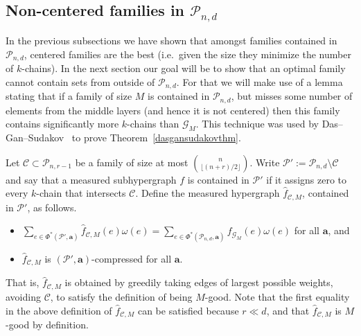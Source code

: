 \documentclass[12pt]{article}
\numberwithin{equation}{section}
\def\C{\mathcal{C}}
\def\G{\mathcal{G}}
\def\P{\mathcal{P}}
\def\w{\omega}
\begin{document}
\subsection{Non-centered families in $\P_{n,d}$}
In the previous subsections we have shown that amongst families contained in $\P_{n,d}$, centered families are the best (i.e.~given the size they minimize the number of $k$-chains). In the next section our goal will be to show that an optimal family cannot contain sets from outside of $\P_{n,d}$. For that we will make use of a lemma stating that if a family of size $M$ is contained in $\P_{n,d}$, but misses some number of elements from the middle layers (and hence it is not centered) then this family contains significantly more $k$-chains than $\G_M$. This technique was used by Das--Gan--Sudakov~\cite{dasgansuda} to prove Theorem~\ref{dasgansudakovthm}.

Let $\C\subset \P_{n,r-1}$ be a family of size at most $\binom{n}{\lfloor(n+r)/2\rfloor}$. Write $\P':=\P_{n,d}\setminus \C$ and say that a measured subhypergraph $f$ is contained in $\P'$ if it assigns zero to every $k$-chain that intersects $\C$.  Define the measured hypergraph $\hat{f}_{\C,M}$, contained in $\P'$, as follows. 
\begin{itemize}
\item $\sum_{e\in \Phi^*(\P',\mathbf{a})}\hat{f}_{\C,M}(e)\w(e)=\sum_{e\in \Phi^*(\P_{n,d},\mathbf{a})}f_{\G_M}(e)\w(e)$ for all $\mathbf{a}$, and
\item $\hat{f}_{\C,M}$ is $(\P',\mathbf{a})$-compressed for all $\mathbf{a}$. 
\end{itemize}
That is, $\hat{f}_{\C,M}$ is obtained by greedily taking edges of largest possible weights, avoiding $\C$, to satisfy the definition of being $M$-good. Note that the first equality in the above definition of $\hat{f}_{\C,M}$ can be satisfied because $r\ll d$, and that $\hat{f}_{\C,M}$ is $M$-good by definition.
\end{document}
